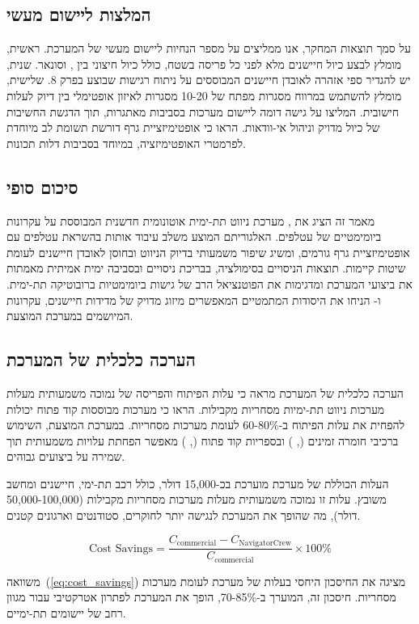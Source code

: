 \subsection{המלצות ליישום מעשי}
\label{sec:practical_recommendations}

על סמך תוצאות המחקר, אנו ממליצים על מספר הנחיות ליישום מעשי של המערכת. ראשית, מומלץ לבצע כיול חיישנים מלא לפני כל פריסה בשטח, כולל כיול חיצוני בין ,  וסונאר. שנית, יש להגדיר ספי אזהרה לאובדן חיישנים המבוססים על ניתוח רגישות שבוצע בפרק 8. שלישית, מומלץ להשתמש במרווח מסגרות מפתח של 10-20 מסגרות לאיזון אופטימלי בין דיוק לעלות חישובית. \citet{Thrun2005ProbRobotics} המליצו על גישה דומה ליישום מערכות  בסביבות מאתגרות, תוך הדגשת החשיבות של כיול מדויק וניהול אי-וודאות. \citet{Grisetti2010g2o} הראו כי אופטימיזציית גרף דורשת תשומת לב מיוחדת לפרמטרי האופטימיזציה, במיוחד בסביבות דלות תכונות.

\subsection{סיכום סופי}
\label{sec:final_summary}

מאמר זה הציג את , מערכת ניווט תת-ימית אוטונומית חדשנית המבוססת על עקרונות ביומימטיים של עטלפים. האלגוריתם  המוצע משלב עיבוד אותות בהשראת עטלפים עם אופטימיזציית גרף גורמים, ומשיג שיפור משמעותי בדיוק הניווט ובחוסן לאובדן חיישנים לעומת שיטות קיימות. תוצאות הניסויים בסימולציה, בבריכת ניסויים ובסביבה ימית אמיתית מאמתות את ביצועי המערכת ומדגימות את הפוטנציאל הרב של גישות ביומימטיות ברובוטיקה תת-ימית. \citet{Kalman1960} ו-\citet{Julier1997CovarianceIntersection} הניחו את היסודות המתמטיים המאפשרים מיזוג מדויק של מדידות חיישנים, עקרונות המיושמים במערכת המוצעת.

\subsection{הערכה כלכלית של המערכת}
\label{sec:economics}

הערכה כלכלית של המערכת מראה כי עלות הפיתוח והפריסה של  נמוכה משמעותית מעלות מערכות ניווט תת-ימיות מסחריות מקבילות. \citet{Thrun2005ProbRobotics} הראו כי מערכות  מבוססות קוד פתוח יכולות להפחית את עלות הפיתוח ב-60-80\% לעומת מערכות מסחריות. במערכת המוצעת, השימוש ברכיבי חומרה זמינים (, ) ובספריות קוד פתוח (, ) מאפשר הפחתת עלויות משמעותית תוך שמירה על ביצועים גבוהים.

העלות הכוללת של מערכת  מוערכת בכ-15,000 דולר, כולל רכב תת-ימי, חיישנים ומחשב משובץ. עלות זו נמוכה משמעותית מעלות מערכות מסחריות מקבילות (50,000-100,000 דולר), מה שהופך את המערכת לנגישה יותר לחוקרים, סטודנטים וארגונים קטנים.

\begin{equation}
\text{Cost Savings} = \frac{C_{\text{commercial}} - C_{\text{NavigatorCrew}}}{C_{\text{commercial}}} \times 100\%
\label{eq:cost_savings}
\end{equation}

משוואה~(\ref{eq:cost_savings}) מציגה את החיסכון היחסי בעלות של מערכת  לעומת מערכות מסחריות. חיסכון זה, המוערך ב-70-85\%, הופך את המערכת לפתרון אטרקטיבי עבור מגוון רחב של יישומים תת-ימיים.
